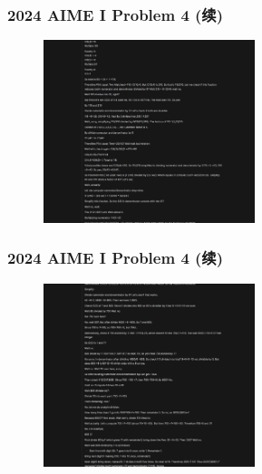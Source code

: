 \begin{frame}
\frametitle{2024 AIME I Problem 4 (续)}
\begin{figure}
    \centering
    \includegraphics[width=0.55\textwidth]{./pic/3.png} %
    \label{fig:aime_solution_1}
\end{figure}
\end{frame}

\begin{frame}
\frametitle{2024 AIME I Problem 4 (续)}
\begin{figure}
    \centering
    \includegraphics[width=0.55\textwidth]{./pic/4.png} %
    \label{fig:aime_solution_2}
\end{figure}
\end{frame}

